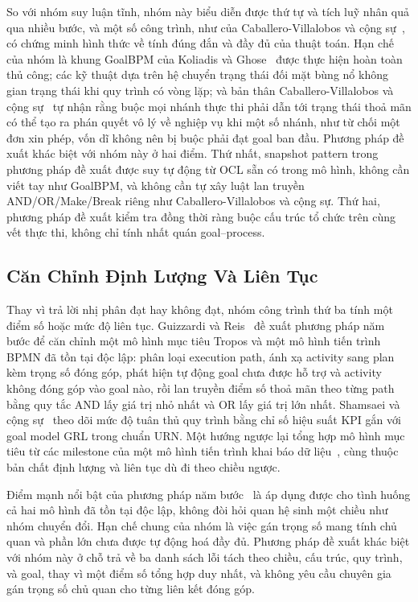 So với nhóm suy luận tĩnh, nhóm này biểu diễn được thứ tự và tích luỹ nhân quả qua nhiều bước, và
một số công trình, như của Caballero-Villalobos và cộng sự~\cite{caballero2026alig}, có chứng minh
hình thức về tính đúng đắn và đầy đủ của thuật toán. Hạn chế của nhóm là khung GoalBPM của Koliadis
và Ghose~\cite{koliadis2006goalbpm} được thực hiện hoàn toàn thủ công; các kỹ thuật dựa trên hệ
chuyển trạng thái đối mặt bùng nổ không gian trạng thái khi quy trình có vòng lặp; và bản thân
Caballero-Villalobos và cộng sự~\cite{caballero2026alig} tự nhận rằng buộc mọi nhánh thực thi phải
dẫn tới trạng thái thoả mãn có thể tạo ra phán quyết vô lý về nghiệp vụ khi một số nhánh, như từ
chối một đơn xin phép, vốn dĩ không nên bị buộc phải đạt goal ban đầu. Phương pháp đề xuất khác biệt
với nhóm này ở hai điểm. Thứ nhất, snapshot pattern trong phương pháp đề xuất được suy tự động từ
OCL sẵn có trong mô hình, không cần viết tay như GoalBPM, và không cần tự xây luật lan truyền
AND/OR/Make/Break riêng như Caballero-Villalobos và cộng sự. Thứ hai, phương pháp đề xuất kiểm tra
đồng thời ràng buộc cấu trúc tổ chức trên cùng vết thực thi, không chỉ tính nhất quán goal--process.

\subsection{Căn Chỉnh Định Lượng Và Liên Tục}\label{sec:rw-quantitative}

Thay vì trả lời nhị phân đạt hay không đạt, nhóm công trình thứ ba tính một điểm số hoặc mức độ liên
tục. Guizzardi và Reis~\cite{guizzardi2012align} đề xuất phương pháp năm bước để căn chỉnh một mô
hình mục tiêu Tropos và một mô hình tiến trình BPMN đã tồn tại độc lập: phân loại execution path,
ánh xạ activity sang plan kèm trọng số đóng góp, phát hiện tự động goal chưa được hỗ trợ và activity
không đóng góp vào goal nào, rồi lan truyền điểm số thoả mãn theo từng path bằng quy tắc AND lấy giá
trị nhỏ nhất và OR lấy giá trị lớn nhất. Shamsaei và cộng sự~\cite{shamsaei2011kpi} theo dõi mức độ
tuân thủ quy trình bằng chỉ số hiệu suất KPI gắn với goal model GRL trong chuẩn URN. Một hướng ngược
lại tổng hợp mô hình mục tiêu từ các milestone của một mô hình tiến trình khai báo dữ
liệu~\cite{n9_2025_goalsynthesis}, cùng thuộc bản chất định lượng và liên tục dù đi theo chiều
ngược.

Điểm mạnh nổi bật của phương pháp năm bước~\cite{guizzardi2012align} là áp dụng được cho tình huống
cả hai mô hình đã tồn tại độc lập, không đòi hỏi quan hệ sinh một chiều như nhóm chuyển đổi. Hạn chế
chung của nhóm là việc gán trọng số mang tính chủ quan và phần lớn chưa được tự động hoá đầy đủ.
Phương pháp đề xuất khác biệt với nhóm này ở chỗ trả về ba danh sách lỗi tách theo chiều, cấu trúc,
quy trình, và goal, thay vì một điểm số tổng hợp duy nhất, và không yêu cầu chuyên gia gán trọng số
chủ quan cho từng liên kết đóng góp.

